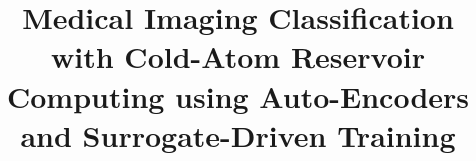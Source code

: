 \documentclass[conference]{IEEEtran}
\begin{document}
\title{Medical Imaging Classification with Cold-Atom Reservoir Computing using Auto-Encoders and Surrogate-Driven Training\\
}

\author{}


\maketitle

\end{document}
